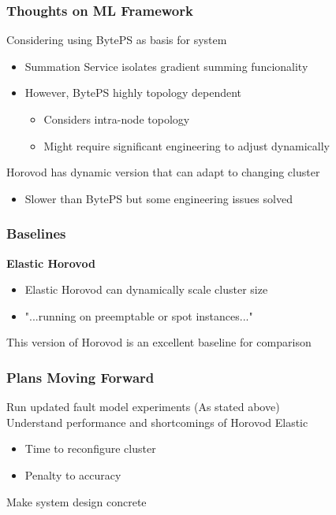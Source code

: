   \begin{frame}
    \frametitle{Thoughts on ML Framework}

    Considering using BytePS as basis for system
    \begin{itemize}
      \item Summation Service isolates gradient summing funcionality
      \item However, BytePS highly topology dependent
      \begin{itemize}
        \item Considers intra-node topology
        \item Might require significant engineering to adjust dynamically
      \end{itemize}
    \end{itemize}

    \vspace{1em}
    Horovod has dynamic version that can adapt to changing cluster
    \begin{itemize}
      \item Slower than BytePS but some engineering issues solved
    \end{itemize}
  \end{frame}

  \begin{frame}
    \frametitle{Baselines}

    \textbf{Elastic Horovod}
    \begin{itemize}
      \item Elastic Horovod can dynamically scale cluster size
      \item "...running on preemptable or spot instances..."
    \end{itemize}

    \vspace{1em}
    This version of Horovod is an excellent baseline for comparison
  \end{frame}

  \begin{frame}
    \frametitle{Plans Moving Forward}

    Run updated fault model experiments (As stated above) \\

    \vspace{1em}
    Understand performance and shortcomings of Horovod Elastic
    \begin{itemize}
      \item Time to reconfigure cluster
      \item Penalty to accuracy
    \end{itemize}

    \vspace{1em}
    Make system design concrete
  \end{frame}


